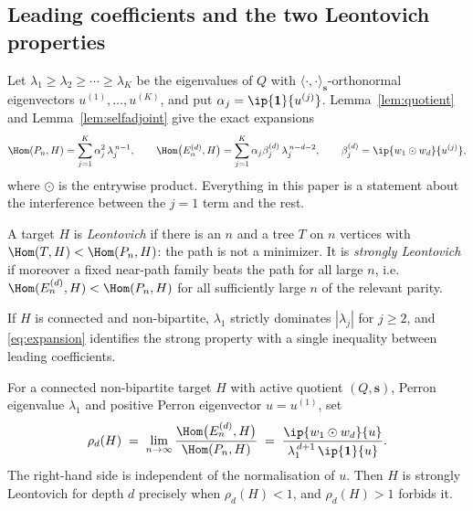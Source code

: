 \subsection{Leading coefficients and the two Leontovich properties}

Let $\lambda_1 \ge \lambda_2 \ge \cdots \ge \lambda_K$ be the eigenvalues
of $Q$ with $\langle\cdot,\cdot\rangle_{\mathbf{s}}$-orthonormal
eigenvectors $u^{(1)},\dots,u^{(K)}$, and put
$\alpha_j = \ip{\mathbf{1}}{u^{(j)}}$. Lemma~\ref{lem:quotient} and
Lemma~\ref{lem:selfadjoint} give the exact expansions
\begin{equation}
  \label{eq:expansion}
  \Hom(P_n,H) = \sum_{j=1}^{K} \alpha_j^{2}\, \lambda_j^{\,n-1},
  \qquad
  \Hom\bigl(E_n^{(d)},H\bigr)
    = \sum_{j=1}^{K} \alpha_j \beta_j^{(d)}\, \lambda_j^{\,n-d-2},
  \qquad
  \beta_j^{(d)} = \ip{w_1 \odot w_d}{u^{(j)}},
\end{equation}
where $\odot$ is the entrywise product. Everything in this paper is a
statement about the interference between the $j = 1$ term and the rest.

\begin{definition}
  \label{def:leontovich}
  A target $H$ is \emph{Leontovich} if there is an $n$ and a tree $T$ on
  $n$ vertices with $\Hom(T,H) < \Hom(P_n,H)$: the path is not a
  minimizer. It is \emph{strongly Leontovich}~\cite{galvin2026} if
  moreover a fixed near-path family beats the path for all large $n$,
  i.e.\ $\Hom(E_n^{(d)},H) < \Hom(P_n,H)$ for all sufficiently large $n$
  of the relevant parity.
\end{definition}

If $H$ is connected and non-bipartite, $\lambda_1$ strictly dominates
$|\lambda_j|$ for $j \ge 2$, and \eqref{eq:expansion} identifies the
strong property with a single inequality between leading coefficients.

\begin{definition}
  \label{def:rho}
  For a connected non-bipartite target $H$ with active quotient
  $(Q,\mathbf{s})$, Perron eigenvalue $\lambda_1$ and positive Perron
  eigenvector $u = u^{(1)}$, set
  \begin{equation}
    \label{eq:rho}
    \rho_d(H) \;=\;
      \lim_{n \to \infty}
      \frac{\Hom\bigl(E_n^{(d)},H\bigr)}{\Hom(P_n,H)}
    \;=\;
      \frac{\ip{w_1 \odot w_d}{u}}
           {\lambda_1^{\,d+1}\, \ip{\mathbf{1}}{u}} .
  \end{equation}
  The right-hand side is independent of the normalisation of $u$. Then
  $H$ is strongly Leontovich for depth $d$ precisely when
  $\rho_d(H) < 1$, and $\rho_d(H) > 1$ forbids it.
\end{definition}

